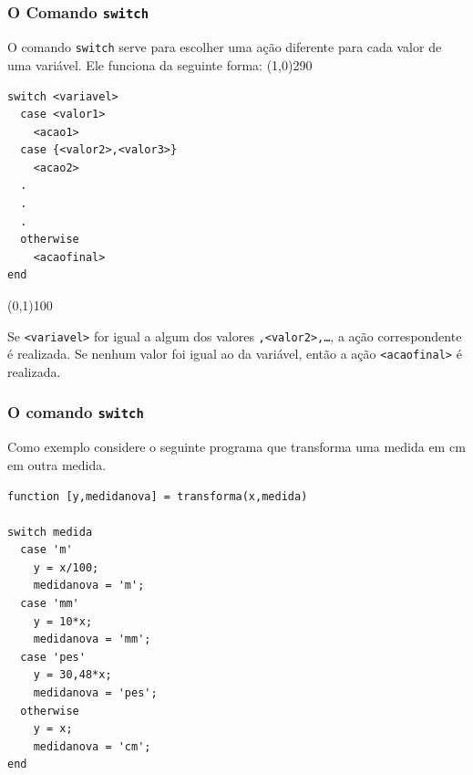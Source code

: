 \documentclass{beamer}
\newcommand{\delim}{\line(1,0){290}}
\newcommand{\barrav}[1]{\line(0,1){#1}}
\begin{document}
\subsection[O Comando switch]{}

\begin{frame}[fragile]
 \frametitle{O Comando {\tt switch}}
O comando {\tt switch} serve para escolher uma a\c{c}\~ao diferente para cada valor de uma vari\'avel. Ele funciona da seguinte forma:
\pause
\delim

{\scriptsize
\begin{minipage}{4 cm}
\begin{verbatim}
switch <variavel>
  case <valor1>
    <acao1>
  case {<valor2>,<valor3>}
    <acao2>
  .
  .
  .
  otherwise
    <acaofinal>
end
\end{verbatim}
\end{minipage}}
\pause
\begin{minipage}{0.2 cm}
\barrav{100}
\end{minipage}
\begin{minipage}{6 cm}
Se {\tt <variavel>} for igual a algum dos valores {\tt <valor1>,<valor2>,\dots}, a a\c{c}\~ao correspondente \'e realizada. Se nenhum valor foi igual ao da vari\'avel, ent\~ao a a\c{c}\~ao {\tt <acaofinal>} \'e realizada.
\end{minipage}

\end{frame}

\begin{frame}[fragile]
\frametitle{O comando {\tt switch}}

Como exemplo considere o seguinte programa que transforma uma medida em cm em outra medida.

{\scriptsize
\begin{verbatim}
function [y,medidanova] = transforma(x,medida)

switch medida
  case 'm'
    y = x/100;
    medidanova = 'm';
  case 'mm'
    y = 10*x;
    medidanova = 'mm';
  case 'pes'
    y = 30,48*x;
    medidanova = 'pes';
  otherwise
  	y = x;
  	medidanova = 'cm';
end
\end{verbatim}
}
\end{frame}

\section[Exerc\'icios]{}
\end{document}
